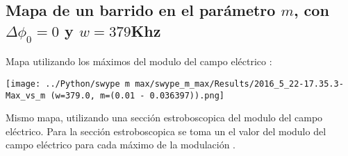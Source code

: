 		
%			
%			
%	
%		
%		
%			
	
		\subsection{Mapa de un barrido en el parámetro $m$, con $\Delta \phi_0 =0 $ y $w=379$Khz}
		
			Mapa utilizando los máximos del modulo del campo eléctrico :
			
			\begin{center}
				\texttt{[image: ../Python/swype m max/swype\_m\_max/Results/2016\_5\_22-17.35.3-Max\_vs\_m (w=379.0, m=(0.01 - 0.036397)).png]}
				\label{fig: mapa m 379}
			\end{center}
			
			Mismo mapa, utilizando una sección estroboscopica del modulo del campo eléctrico.
			Para la sección estroboscopica se toma un el valor del modulo del campo eléctrico para cada máximo de la modulación .
				
